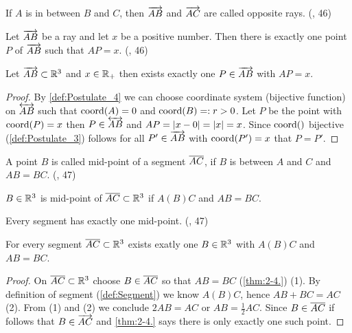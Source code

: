 \begin{definition}\label{def:Oppo_Rays}
  If $A$ is in between $B$ and $C$, then $\overrightarrow{AB}$ and $\overrightarrow{AC}$ are called opposite rays.
  (\cite{SMSGGeometry}, 46)

\end{definition}

\begin{theorem}\label{thm:2-4.}
  Let $\overrightarrow{AB}$ be a ray and let $x$ be a positive number.
  Then there is exactly one point $P$ of $\overrightarrow{AB}$ such that $AP=x$.
  (\cite{SMSGGeometry}, 46)

  Let $\overrightarrow{AB} \subset \mathbb{R}^3$ and $x \in \mathbb{R}_+$ then exists exactly one $P \in \overrightarrow{AB}$ with $AP=x$.
\end{theorem}

\begin{proof}
  By \ref{def:Postulate_4} we can choose coordinate system (bijective function) on $\overleftrightarrow{AB}$ such that $\operatorname{coord}({A})=0$ and $\operatorname{coord}({B})=:r>0$.
  Let $P$ be the point with $\operatorname{coord}({P})=x$ then $ P \in \overleftrightarrow{AB}$ and $AP=\left\vert x-0 \right\vert=\left\vert x \right\vert=x$.
  Since $\operatorname{coord}({})$ bijective (\ref{def:Postulate_3}) follows for all $P' \in \overrightarrow{AB}$ with $\operatorname{coord}({P'})=x$ that $P=P'$.
\end{proof}

\begin{definition}\label{def:Mid-Point}
  A point $B$ is called mid-point of a segment $\overline{AC}$, if $B$ is between $A$ and $C$ and $AB=BC$.
  (\cite{SMSGGeometry}, 47)

  $B \in \mathbb{R}^3$ is mid-point of $\overline{AC} \subset \mathbb{R}^3$ if $A(B)C$ and $AB=BC$.
\end{definition}

\begin{theorem}[2-5.]\label{thm:2-5.}
  Every segment has exactly one mid-point.
  (\cite{SMSGGeometry}, 47)

  For every segment $\overline{AC} \subset \mathbb{R}^3$ exists exatly one $B\in \mathbb{R}^3$ with $A(B)C$ and $AB=BC$.
\end{theorem}
\begin{proof}
  On $\overline{AC} \subset \mathbb{R}^3$ choose $B \in \overline{AC}$ so that $AB=BC$ (\ref{thm:2-4.}) (1).
  By definition of segment (\ref{def:Segment}) we know $A(B)C$, hence $AB+BC=AC$ (2).
  From (1) and (2) we conclude $2AB=AC$ or $AB=\frac{1}{2}AC$.
  Since $B \in \overline{AC}$ if follows that $B \in \overrightarrow{AC}$ and \ref{thm:2-4.} says there is only exactly one such point.

\end{proof}

